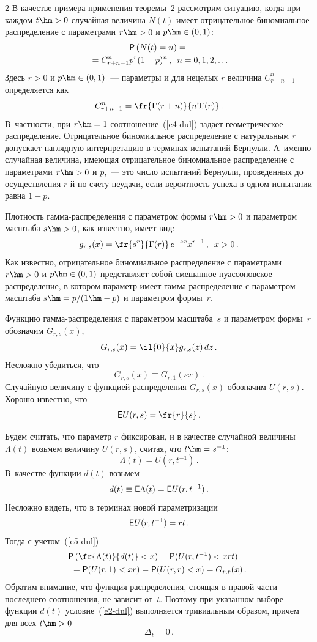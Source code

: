 \begin{multicols}{2}
В качестве примера применения теоремы~2 рассмотрим ситуацию, когда
при каждом $t\hm>0$ случайная величина $N(t)$ имеет отрицательное
биномиальное распределение с параметрами $r\hm>0$ и $p\hm\in(0,1)$:
\begin{multline}
{\sf P}\left(N(t)=n\right)={}\\
{}= C_{r+n-1}^{n}p^r(1-p)^{n}\,,\enskip
n=0,1,2,\ldots
\label{e4-dul}
\end{multline}
Здесь $r>0$ и $p\hm\in(0,1)$~--- параметры и для нецелых $r$ величина
$C_{r+n-1}^{n}$ определяется как 
$$ 
C_{r+n-1}^{n} = \fr{\Gamma(r+n)}{n!\Gamma(r)}\,. 
$$ 
В~частности, при $r\hm=1$
соотношение~(\ref{e4-dul}) задает геометрическое распределение. Отрицательное
биномиальное распределение с натуральным $r$ допускает наглядную
интерпретацию в терминах испытаний Бернулли. А~именно случайная
величина, име\-ющая отрицательное биномиальное распределение с
параметрами $r\hm>0$ и $p$,~--- это число испытаний Бернулли,
проведенных до осуществления $r$-й по счету неудачи, если
вероятность успеха в одном испытании равна $1-p$.

Плотность гамма-распределения с параметром формы $r\hm>0$ и параметром
масштаба $s\hm>0$, как известно, имеет вид:
$$
g_{r,s}(x)=\fr{s^r}{\Gamma(r)}\,e^{-s x}x^{r-1}\,,\enskip x>0\,.
$$
Как известно, отрицательное биномиальное распределение с параметрами
$r\hm>0$ и $p\hm\in(0,1)$ представ\-ля\-ет собой смешанное пуассоновское
распределение, в котором параметр имеет гам\-ма-рас\-пре\-де\-ле\-ние с
параметром масштаба $s\hm=p/(1\hm-p)$ и параметром формы~$r$.

Функцию гамма-распределения с параметром масштаба~$s$ и параметром
формы~$r$ обозначим $G_{r,s}(x)$,
$$
G_{r,s}(x)=\il{0}{x}g_{r,s}(z)\,dz\,.
$$
Несложно убедиться, что
\begin{equation}
G_{r,s}(x)\equiv G_{r,1}(s x)\,.
\label{e5-dul}
\end{equation}
Случайную величину с функцией распределения $G_{r,s}(x)$ обозначим
$U(r,s)$. Хорошо известно, что 
$$
{\sf E}U(r,s)=\fr{r}{s}\,.
$$

Будем считать, что параметр $r$ фиксирован, и в качестве случайной
величины $\Lambda(t)$ возьмем величину $U(r,s)$, считая, что
$t\hm=s^{-1}$: 
$$
\Lambda(t)=U(r,t^{-1})\,.
$$ 
В~качестве функции $d(t)$
возьмем 
$$
d(t)\equiv{\sf E}\Lambda(t)={\sf E}U(r,t^{-1})\,.
$$ 
Несложно видеть, что в терминах новой параметризации 
$$
{\sf E}U(r,t^{-1})=rt\,.
$$ 
Тогда с учетом~(\ref{e5-dul}) 
\begin{multline*}
{\sf P}\left(\fr{\Lambda(t)}{d(t)}<x\right)={\sf P}(U(r,t^{-1})<xrt)={}\\
{}=
{\sf P}(U(r,1)<xr)={\sf
P}(U(r,r)<x)=G_{r,r}(x)\,.
\end{multline*}
Обратим внимание, что функция
распределения, стоящая в правой части последнего соотношения, не
зависит от~$t$. Поэтому при указанном выборе функции $d(t)$ условие~(\ref{e2-dul}) 
выполняется тривиальным образом, причем для всех $t\hm>0$
$$
\Delta_t=0\,.
$$


\end{multicols}
